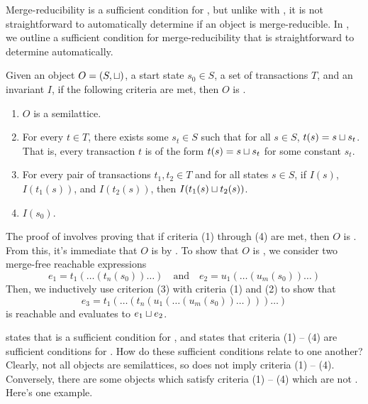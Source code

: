 Merge-reducibility is a sufficient condition for \invariantconfluence{}, but
unlike with \invariantclosure{}, it is not straightforward to automatically
determine if an object is merge-reducible. In , we
outline a sufficient condition for merge-reducibility that is straightforward
to determine automatically.

\begin{theorem}
  Given an object $O = (S, \sqcup)$, a start state $s_0 \in S$, a set of
  transactions $T$, and an invariant $I$, if the following criteria are met,
  then $O$ is \sTIconfluent{}.
  \begin{enumerate}
    \item
      $O$ is a semilattice.

    \item
      For every $t \in T$, there exists some $s_t \in S$ such that for all $s
      \in S$, $t(s) = s \sqcup s_t$. That is, every transaction $t$ is of the
      form $t(s) = s \sqcup s_t$ for some constant $s_t$.

    \item
      For every pair of transactions $t_1, t_2 \in T$ and for all states $s \in
      S$, if $I(s)$, $I(t_1(s))$, and $I(t_2(s))$, then $I(t_1(s) \sqcup
      t_2(s))$.

    \item
      $I(s_0)$.
  \end{enumerate}
\end{theorem}

The proof of  involves proving that if criteria (1)
through (4) are met, then $O$ is \sTImergereducible{}. From this, it's
immediate that $O$ is \sTIconfluent{} by
. To show that $O$ is
\sTImergereducible, we consider two merge-free reachable expressions
\[
  e_1 = t_1(\ldots(t_n(s_0))\ldots)
  \quad\text{and}\quad
  e_2 = u_1(\ldots(u_m(s_0))\ldots)
\]
Then, we inductively use criterion (3) with criteria (1) and (2) to show that
\[
  e_3 = t_1(\ldots(
          t_n(u_1(\ldots(u_m(s_0))\ldots))
        )\ldots)
\]
is reachable and evaluates to $e_1 \sqcup e_2$.

 states that \invariantclosure{} is a
sufficient condition for \invariantconfluence{}, and 
states that criteria (1) -- (4) are sufficient conditions for
\invariantconfluence{}. How do these sufficient conditions relate to one
another?  Clearly, not all \invariantclosed{} objects are semilattices, so
\invariantclosure{} does not imply criteria (1) -- (4). Conversely, there are
some objects which satisfy criteria (1) -- (4) which are not
\invariantclosed{}. Here's one example.

